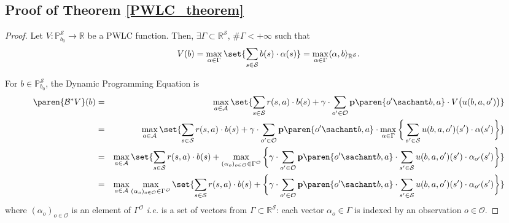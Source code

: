 \subsection{Proof of Theorem \ref{PWLC_theorem}}
\label{PWLC_theorem_RETURN}
\begin{proof}
Let $V: \mathbb{P}^{\mathcal{S}}_{b_0} \rightarrow \mathbb{R}$ be a PWLC function. 
Then, $\exists \Gamma \subset \mathbb{R}^{\mathcal{S}}$, $\# \Gamma < + \infty$ such that 
\[ V(b)=\max_{\alpha \in \Gamma} \set{ \sum_{s \in \mathcal{S}} b(s) \cdot \alpha(s) } = \max_{\alpha \in \Gamma} \langle \alpha, b \rangle_{\mathbb{R}^{\mathcal{S}}}  . \] 

For $b \in \mathbb{P}^{\mathcal{S}}_{b_0}$, the Dynamic Programming Equation is
\begin{eqnarray*}
\paren{\mathcal{B}^* V}(b) & = & \max_{a \in \mathcal{A}} \set{ \sum_{s \in \mathcal{S}} r(s,a) \cdot b(s) + \gamma \cdot \sum_{o' \in \mathcal{O}} \textbf{p} \paren{o' \sachant b , a } \cdot V \big( u(b,a,o') \big) } \\
& = & \max_{a \in \mathcal{A}} \set{ \sum_{s \in \mathcal{S}} r(s,a) \cdot b(s) + \gamma \cdot \sum_{o' \in \mathcal{O}} \textbf{p} \paren{o' \sachant b , a } \cdot \max_{\alpha \in \Gamma} \bigg\{ \sum_{s' \in \mathcal{S}} u(b,a,o')(s') \cdot \alpha(s') \bigg\} } \\
& = & \max_{a \in \mathcal{A}} \set{ \sum_{s \in \mathcal{S}} r(s,a) \cdot b(s) +  \max_{(\alpha_{o})_{o \in \mathcal{O}} \in \Gamma^\mathcal{O}} \bigg\{ \gamma \cdot \sum_{o' \in \mathcal{O}} \textbf{p} \paren{o' \sachant b , a } \cdot \sum_{s' \in \mathcal{S}} u(b,a,o')(s') \cdot \alpha_{o'}(s') \bigg\} } \\
& = & \max_{a \in \mathcal{A}} \max_{(\alpha_{o})_{o \in \mathcal{O}} \in \Gamma^\mathcal{O}} \set{ \sum_{s \in \mathcal{S}} r(s,a) \cdot b(s) + \bigg\{ \gamma \cdot \sum_{o' \in \mathcal{O}} \textbf{p} \paren{o' \sachant b , a } \cdot \sum_{s' \in \mathcal{S}} u(b,a,o')(s') \cdot \alpha_{o'}(s') \bigg\} }
\end{eqnarray*}
where $(\alpha_{o})_{o \in \mathcal{O}}$ is an element of $\Gamma^\mathcal{O}$
\textit{i.e.} is a set of vectors from $\Gamma \subset \mathbb{R}^{\mathcal{S}}$:
each vector $\alpha_{o} \in \Gamma$ is indexed by an observation $o \in \mathcal{O}$.


\end{proof}
